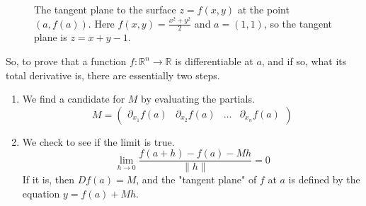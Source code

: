 	\begin{figure}[H]
		\centering
		\caption{The tangent plane to the surface $z=f(x,y)$ at the point $(a,f(a))$. Here $f(x,y)=\frac{x^2+y^2}{2}$ and $a=(1,1)$, so the tangent plane is $z=x+y-1$.}
		\label{fig:tangent_plane}
	\end{figure}

  So, to prove that a function $f: \mathbb{R}^n \to \mathbb{R}$ is differentiable at $a$, and if so, what its total derivative is, there are essentially two steps. 
  \begin{enumerate}
    \item We find a candidate for $M$ by evaluating the partials. 
    \begin{equation}
      M = \begin{pmatrix} \partial_{x_1} f(a) & \partial_{x_2} f(a) & \ldots & \partial_{x_n} f(a) \end{pmatrix}
    \end{equation}
    \item We check to see if the limit is true. 
    \begin{equation}
      \lim_{h \rightarrow 0} \frac{f(a + h) - f(a) - M h}{\|h\|} = 0
    \end{equation}
    If it is, then $D f(a) = M$, and the "tangent plane" of $f$ at $a$ is defined by the equation $y = f(a) + M h$. 
  \end{enumerate}

